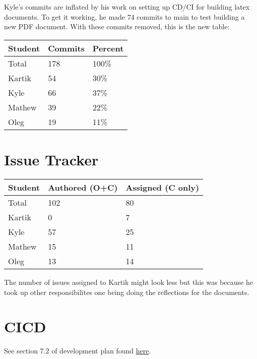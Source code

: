 \documentclass{article}
\begin{document}
Kyle's commits are inflated by his work on setting up CD/CI for building latex documents. To get it working, he made 74 commits to main to test building a new PDF document. With these commits removed, this is the new table:\\
\begin{table}[H]
    \centering
    \begin{tabular}{lll}
    \toprule
    \textbf{Student} & \textbf{Commits} & \textbf{Percent}\\
    \midrule
    Total & 178 & 100\% \\
    Kartik & 54 & 30\%\\
    Kyle   & 66 & 37\%\\
    Mathew & 39 & 22\%\\
    Oleg   & 19 & 11\%\\
    \bottomrule
    \end{tabular}
    \end{table}
\section{Issue Tracker}


\begin{table}[H]
\centering
\begin{tabular}{lll}
\toprule
\textbf{Student} & \textbf{Authored (O+C)} & \textbf{Assigned (C only)}\\
\midrule
Total & 102 & 80 \\
Kartik & 0 & 7\\
Kyle   & 57 & 25\\
Mathew & 15 & 11\\
Oleg   & 13 & 14\\
\bottomrule
\end{tabular}
\end{table}

The number of issues assigned to Kartik might look less but this was because he took up other responsibilites one being doing the reflections for the documents.\\

\section{CICD}

See section 7.2 of development plan found \href{https://github.com/OKKM-insights/OKKM.insights/blob/main/docs/DevelopmentPlan/DevelopmentPlan.pdf}{here}.

\end{document}
